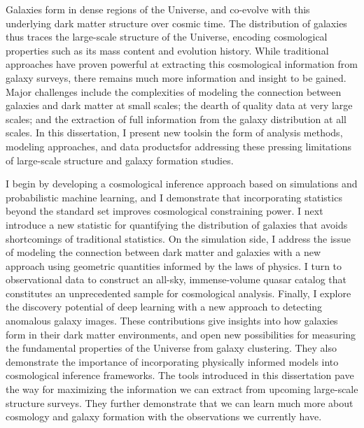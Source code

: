 Galaxies form in dense regions of the Universe, and co-evolve with this underlying dark matter structure over cosmic time.
The distribution of galaxies thus traces the large-scale structure of the Universe, encoding cosmological properties such as its mass content and evolution history.
While traditional approaches have proven powerful at extracting this cosmological information from galaxy surveys, there remains much more information and insight to be gained.
Major challenges include the complexities of modeling the connection between galaxies and dark matter at small scales; the dearth of quality data at very large scales; and the extraction of full information from the galaxy distribution at all scales.
In this dissertation, I present new tools{\emdash}in the form of analysis methods, modeling approaches, and data products{\emdash}for addressing these pressing limitations of large-scale structure and galaxy formation studies.

I begin by developing a cosmological inference approach based on simulations and probabilistic machine learning, and I demonstrate that incorporating statistics beyond the standard set improves cosmological constraining power.
I next introduce a new statistic for quantifying the distribution of galaxies that avoids shortcomings of traditional statistics.
On the simulation side, I address the issue of modeling the connection between dark matter and galaxies with a new approach using geometric quantities informed by the laws of physics.
I turn to observational data to construct an all-sky, immense-volume quasar catalog that constitutes an unprecedented sample for cosmological analysis.
Finally, I explore the discovery potential of deep learning with a new approach to detecting anomalous galaxy images.
These contributions give insights into how galaxies form in their dark matter environments, and open new possibilities for measuring the fundamental properties of the Universe from galaxy clustering.
They also demonstrate the importance of incorporating physically informed models into cosmological inference frameworks.
The tools introduced in this dissertation pave the way for maximizing the information we can extract from upcoming large-scale structure surveys.
They further demonstrate that we can learn much more about cosmology and galaxy formation with the observations we currently have.